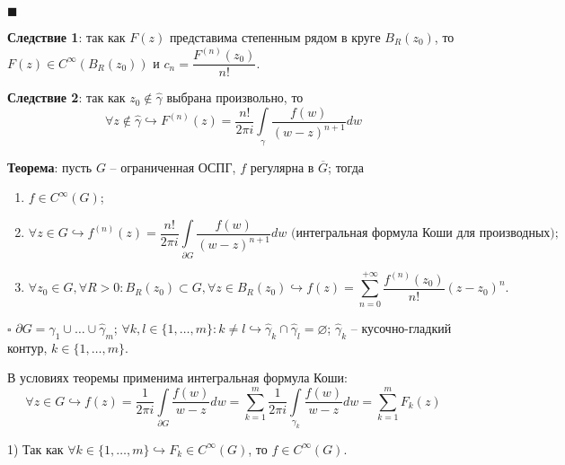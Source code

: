 \documentclass[12pt, a4paper, reqno]{article}
\begin{document}
    $\blacksquare$

    \textbf{Следствие 1}: так как $F(z)$ представима степенным рядом в круге $B_R(z_0)$, то
    $F(z) \in C^{\infty}(B_R(z_0))$ и $c_n = \dfrac{F^{(n)}(z_0)}{n!}$.

    \textbf{Следствие 2}: так как $z_0 \not\in \hat{\gamma}$ выбрана произвольно, то
    \begin{equation*}
        \forall z \not\in \hat{\gamma} \hookrightarrow
        F^{(n)}(z) = \frac{n!}{2\pi i}\int\limits_{\gamma}\frac{f(w)}{(w - z)^{n + 1}}dw
    \end{equation*}

    \textbf{Теорема}: пусть $G$ -- ограниченная ОСПГ, $f$ регулярна в $\overline{G}$; тогда
    \begin{enumerate}
        \item $f \in C^{\infty}(G)$;
        \item
            \begin{equation*}
                \forall z \in G \hookrightarrow \boxed{f^{(n)}(z) =
                \frac{n!}{2\pi i}\int\limits_{\partial G}\frac{f(w)}{(w - z)^{n + 1}}dw}
                \text{ (интегральная формула Коши для производных)};
            \end{equation*}
        \item
            \begin{equation*}
                \forall z_0 \in G, \forall R > 0 : B_R(z_0) \subset G, \forall z \in B_R(z_0)
                \hookrightarrow f(z) = \sum\limits_{n = 0}^{+\infty}\frac{f^{(n)}(z_0)}{n!}(z - z_0)^n.
            \end{equation*}
    \end{enumerate}

    $\square$ $\partial G = \hat{\gamma}_1 \cup \ldots \cup \hat{\gamma}_m$;
    $\forall k, l \in \{1, \ldots, m\} : k \neq l \hookrightarrow
    \hat{\gamma}_k \cap \hat{\gamma}_l = \varnothing$; $\hat{\gamma}_k$ -- кусочно-гладкий контур,
    $k \in \{1, \ldots, m\}$.

    В условиях теоремы применима интегральная формула Коши:
    \begin{equation*}
        \forall z \in G \hookrightarrow
        f(z) = \frac{1}{2\pi i}\int\limits_{\partial G}\frac{f(w)}{w - z}dw =
        \sum\limits_{k = 1}^{m} \frac{1}{2\pi i}\int\limits_{\gamma_k}\frac{f(w)}{w - z}dw =
        \sum\limits_{k = 1}^{m} F_k(z)
    \end{equation*}

    1) Так как $\forall k \in \{1, \ldots, m\} \hookrightarrow F_k \in C^{\infty}(G)$, то
    $f \in C^{\infty}(G)$.
\end{document}
